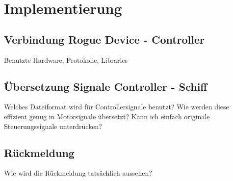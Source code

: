 \chapter{Implementierung}

\section{Verbindung Rogue Device - Controller}
Benutzte Hardware, Protokolle, Libraries

\section{Übersetzung Signale Controller - Schiff}
Welches Dateiformat wird für Controllersignale benutzt?
Wie werden diese effizient genug in Motorsignale übersetzt?
Kann ich einfach originale Steuerungssignale unterdrücken?

\section{Rückmeldung}
Wie wird die Rückmeldung tatsächlich aussehen?